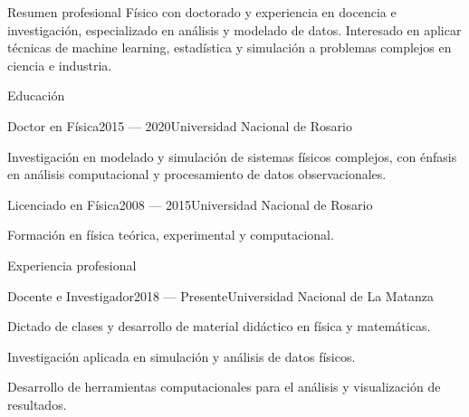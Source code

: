 \documentclass[a4paper,10pt]{resume}
\begin{document}
\begin{rSection}{Resumen profesional}
Físico con doctorado y experiencia en docencia e investigación, especializado en análisis y modelado de datos. Interesado en aplicar técnicas de machine learning, estadística y simulación a problemas complejos en ciencia e industria.
\end{rSection}
\begin{rSection}{Educación}
\begin{rSubsection}{Doctor en Física}{2015 --- 2020}{Universidad Nacional de Rosario}{}
\item Investigación en modelado y simulación de sistemas físicos complejos, con énfasis en análisis computacional y procesamiento de datos observacionales.
\end{rSubsection}
\begin{rSubsection}{Licenciado en Física}{2008 --- 2015}{Universidad Nacional de Rosario}{}
\item Formación en física teórica, experimental y computacional.
\end{rSubsection}
\end{rSection}
\begin{rSection}{Experiencia profesional}
\begin{rSubsection}{Docente e Investigador}{2018 --- Presente}{Universidad Nacional de La Matanza}{}
\item Dictado de clases y desarrollo de material didáctico en física y matemáticas.
\item Investigación aplicada en simulación y análisis de datos físicos.
\item Desarrollo de herramientas computacionales para el análisis y visualización de resultados.
\end{rSubsection}
\end{rSection}
\end{document}
